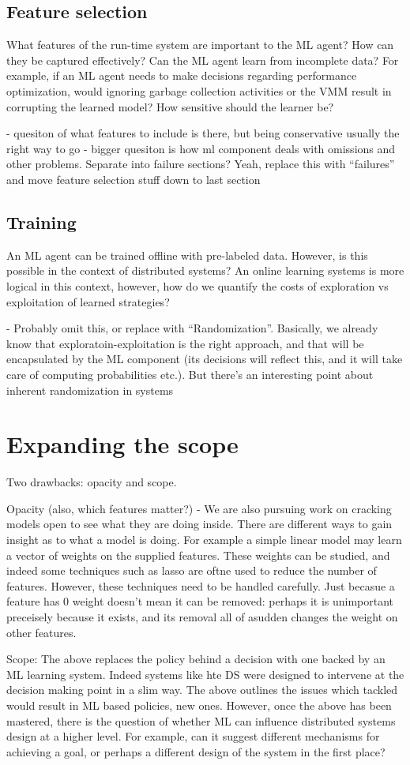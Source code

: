 \documentclass[a4paper,twocolumn]{article}
\begin{document}
\subsection*{Feature selection}
What features of the run-time system are important to the ML agent? How can they
be captured effectively? Can the ML agent learn from incomplete data? For
example, if an ML agent needs to make decisions regarding performance
optimization, would ignoring garbage collection activities or the VMM result in
corrupting the learned model? How sensitive should the learner be?

- quesiton of what features to include is there, but being conservative usually the right
way to go
- bigger quesiton is how ml component deals with omissions and other problems. Separate
into failure sections? Yeah, replace this with ``failures'' and move feature selection stuff
down to last section

\subsection*{Training}
An ML agent can be trained offline with pre-labeled data. However, is this
possible in the context of distributed systems? An online learning systems is
more logical in this context, however, how do we quantify the costs of
exploration vs exploitation of learned strategies?

- Probably omit this, or replace with ``Randomization''. Basically, we already know
that exploratoin-exploitation is the right approach, and that will be encapsulated
by the ML component (its decisions will reflect this, and it will take care of
computing probabilities etc.). But there's an interesting point about inherent randomization
in systems

\section{Expanding the scope}

Two drawbacks: opacity and scope.

Opacity (also, which features matter?)
- We are also pursuing work on cracking models open to see what they are doing inside.
There are different ways to gain insight as to what a model is doing. For example a simple
linear model may learn a vector of weights on the supplied features. These weights can be
studied, and indeed some techniques such as lasso are oftne used to reduce the number of features. However, these
techniques need to be handled carefully. Just becasue a feature has 0 weight doesn't mean it
can be removed: perhaps it is unimportant preceisely because it exists, and its removal all of
asudden changes the weight on other features.

Scope:
The above replaces the policy behind a decision with one backed by an ML learning system.
Indeed systems like hte DS were designed to intervene at the decision making point in a
slim way. The above outlines the issues which tackled would result in ML based policies,
new ones. However, once the above has been mastered, there is the question of whether ML
can influence distributed systems design at a higher level. For example, can it suggest
different mechanisms for achieving a goal, or perhaps a different design of the system in the first place?
\end{document}
